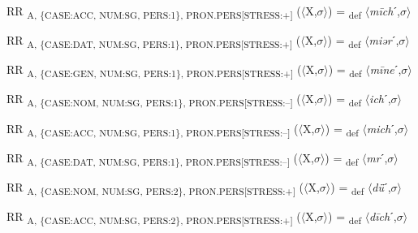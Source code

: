{\begin{exe}
 RR \textsubscript{A, \{CASE:ACC, NUM:SG, PERS:1\}, PRON.PERS[STRESS:+]} ($\langle$X,$\sigma $$\rangle$) = \textsubscript{def} $\langle$\textit{m\=ich}ˊ,$\sigma $$\rangle$
\end{exe}

\begin{exe}
 RR \textsubscript{A, \{CASE:DAT, NUM:SG, PERS:1\}, PRON.PERS[STRESS:+]} ($\langle$X,$\sigma $$\rangle$) = \textsubscript{def} $\langle$\textit{miər}ˊ,$\sigma $$\rangle$
\end{exe}

\begin{exe}
 RR \textsubscript{A, \{CASE:GEN, NUM:SG, PERS:1\}, PRON.PERS[STRESS:+]} ($\langle$X,$\sigma $$\rangle$) = \textsubscript{def} $\langle$\textit{m\=ine}ˊ,$\sigma $$\rangle$
\end{exe}

\begin{exe}
 RR \textsubscript{A, \{CASE:NOM, NUM:SG, PERS:1\}, PRON.PERS[STRESS:–]} ($\langle$X,$\sigma $$\rangle$) = \textsubscript{def} $\langle$\textit{ich}ˊ,$\sigma $$\rangle$
\end{exe}

\begin{exe}
 RR \textsubscript{A, \{CASE:ACC, NUM:SG, PERS:1\}, PRON.PERS[STRESS:–]} ($\langle$X,$\sigma $$\rangle$) = \textsubscript{def} $\langle$\textit{mich}ˊ,$\sigma $$\rangle$
\end{exe}

\begin{exe}
 RR \textsubscript{A, \{CASE:DAT, NUM:SG, PERS:1\}, PRON.PERS[STRESS:–]} ($\langle$X,$\sigma $$\rangle$) = \textsubscript{def} $\langle$\textit{mr}ˊ,$\sigma $$\rangle$
\end{exe}

\begin{exe}
 RR \textsubscript{A, \{CASE:NOM, NUM:SG, PERS:2\}, PRON.PERS[STRESS:+]} ($\langle$X,$\sigma $$\rangle$) = \textsubscript{def} $\langle$\textit{dǖ}ˊ,$\sigma $$\rangle$
\end{exe}

\begin{exe}
 RR \textsubscript{A, \{CASE:ACC, NUM:SG, PERS:2\}, PRON.PERS[STRESS:+]} ($\langle$X,$\sigma $$\rangle$) = \textsubscript{def} $\langle$\textit{d\=ich}ˊ,$\sigma $$\rangle$
\end{exe}

}
